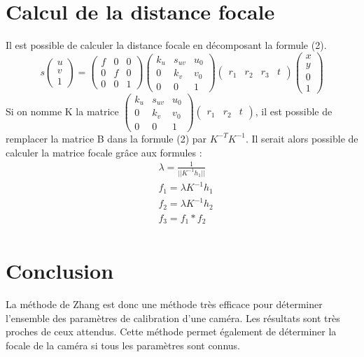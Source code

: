 \documentclass[a4paper,10pt]{article}
\begin{document}
\section{Calcul de la distance focale}
Il est possible de calculer la distance focale en décomposant la formule (2).
\begin{equation}
 s\begin{pmatrix}u\\v\\1\end{pmatrix} = \begin{pmatrix}f&0&0\\0&f&0\\0&0&1\end{pmatrix}\begin{pmatrix}k_u&s_{uv}&u_0\\0&k_v&v_0\\0&0&1\end{pmatrix}
					\begin{pmatrix}r_1&r_2&r_3&t\end{pmatrix}\begin{pmatrix}x\\y\\0\\1\end{pmatrix}
\end{equation}
Si on nomme K la matrice $\begin{pmatrix}k_u&s_{uv}&u_0\\0&k_v&v_0\\0&0&1\end{pmatrix}\begin{pmatrix}r_1&r_2&t\end{pmatrix}$, il est possible de 
remplacer la matrice B dans la formule (2) par $K^{-T}K^{-1}$. 
Il serait alors possible de calculer la matrice focale grâce aux formules :
\begin{align}
 &\lambda = \frac{1}{||K^{-1}h_1||}\\
 &f_1=\lambda K^{-1}h_1\\
 &f_2=\lambda K^{-1}h_2\\
 &f_3=f_1*f_2\\
\end{align}

\section{Conclusion}
La méthode de Zhang est donc une méthode très efficace pour déterminer l'ensemble des paramètres
de calibration d'une caméra. Les résultats sont très proches de ceux attendus. Cette méthode
permet également de déterminer la focale de la caméra si tous les paramètres sont connus.
\end{document}
